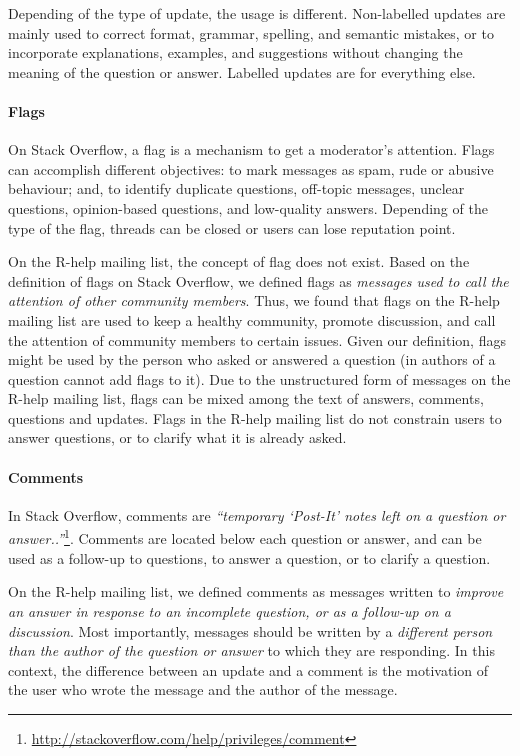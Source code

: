 	Depending of the type of update, the usage is different.
	Non-labelled updates are mainly used to correct format, grammar, spelling, and semantic mistakes, or to incorporate explanations, examples, and suggestions without changing the meaning of the question or answer. Labelled updates are for everything else.


\paragraph*{Flags}

	On Stack Overflow, a flag is a mechanism to get a moderator's attention.
	Flags can accomplish different objectives: to mark messages as spam, rude or abusive behaviour; and, to identify duplicate questions, off-topic messages, unclear questions, opinion-based questions, and low-quality answers.
	Depending of the type of the flag, threads can be closed or users can lose reputation point.
    
    On the R-help mailing list, the concept of flag does not exist. 
    Based on the definition of flags on Stack Overflow, we defined flags as \emph{messages used to call the attention of other community members}.
    Thus, we found that flags on the R-help mailing list are used to keep a healthy community, promote discussion, and call the attention of community members to certain issues.
    Given our definition, flags might be used by the person who asked or answered a question (in \SO authors of a question cannot add flags to it).
    Due to the unstructured form of messages on the R-help mailing list, flags can be mixed among the text of answers, comments, questions and updates.
	Flags in the R-help mailing list do not constrain users to answer questions, or to clarify what it is already asked.

\paragraph*{Comments}
In Stack Overflow, comments are \textit{``temporary `Post-It' notes left on a question or answer..''}\footnote{\url{http://stackoverflow.com/help/privileges/comment}}.
	Comments are located below each question or answer, and can be used as a follow-up to questions, to answer a question, or to clarify a question.

	On the R-help mailing list, we defined comments as messages written to \emph{improve an answer in response to an incomplete question, or as a follow-up on a discussion}.
	Most importantly, messages should be written by a \emph{different person than the author of the question or answer} to which they are responding.
	In this context, the difference between an update and a comment is the motivation of the user who wrote the message and the author of the message.

